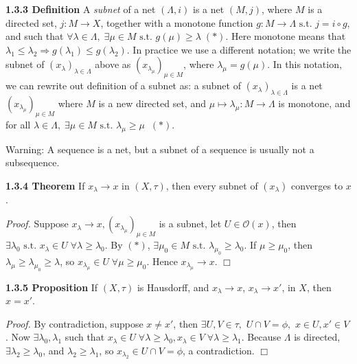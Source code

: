 \documentclass[12pt]{article}
\newcommand{\st}[0]{ \textrm{ s.t. } }
\newcommand{\rimply}[0] { \Rightarrow }
\newcommand{\rarw}[0] { \rightarrow }
\newcommand{\curlyO}[0] { \mathcal{O} }
\begin{document}
\begin{flushleft} {\bf 1.3.3 Definition} A \emph{subnet} of a net $(\Lambda, i)$ is
a net $(M, j)$, where $M$ is a directed set, $j: M \rarw X$, together with a  monotone
function $g: M \rarw \Lambda \st j = i \circ g$, and such that $\forall \lambda \in
 \Lambda, \; \exists \mu \in M \st g(\mu) \ge \lambda \; (*)$. Here monotone means that
 $\lambda_1 \le \lambda_2 \rimply g(\lambda_1) \le g(\lambda_2)$. In practice we use a
 different notation; we write the subnet of $(x_\lambda)_{\lambda \in \Lambda}$ above as
  $(x_{\lambda_\mu}) _{\mu \in M}$, where $\lambda_\mu = g(\mu)$. In this notation, we
   can rewrite out definition of a subnet as: a subnet of $(x_\lambda)_{\lambda \in
   \Lambda}$ is a net $(x_{\lambda_\mu})_{\mu \in M}$ where $M$ is a new directed set,
   and $\mu \mapsto \lambda_\mu: M \rarw \Lambda$ is monotone, and for all $\lambda \in
   \Lambda, \; \exists \mu \in M \st \lambda_\mu \ge \mu \; \; (*)$.
\end{flushleft}

Warning: A sequence is a net, but a subnet of a sequence is usually
not a subsequence.

\begin{flushleft} {\bf 1.3.4 Theorem} If $x_\lambda \rarw x$ in $(X, \tau)$, then every
 subnet of $(x_\lambda)$ converges to $x$.
\end{flushleft}

\begin{flushleft} \emph{Proof. } Suppose $x_\lambda \rarw x, (x_{\lambda_\mu})_{\mu \in M}$
 is a subnet, let $U \in \curlyO(x)$, then $\exists \lambda_0 \st x_\lambda \in U \;
  \forall \lambda \ge \lambda_0$. By $(*)$, $\exists \mu_0 \in M \st \lambda_{\mu_0}
  \ge \lambda_0$. If $\mu \ge \mu_0$, then $\lambda_\mu \ge \lambda_{\mu_0}
  \ge \lambda$, so $x_{\lambda_\mu} \in U \; \forall \mu \ge \mu_0.$
   Hence
  $x_{\lambda_\mu} \rarw x$.
$\Box$
\end{flushleft}


\begin{flushleft} {\bf 1.3.5 Proposition} If $(X, \tau)$ is Hausdorff, and $x_\lambda \rarw x$, $x_\lambda \rarw x'$, in $X$, then $x = x'$.
\end{flushleft}

\begin{flushleft} \emph{Proof. } By contradiction, suppose $x \not = x'$, then $\exists
 U, V \in \tau,$ $U \cap V = \phi,$ $x \in U, x' \in V$. Now $\exists \lambda_0,
 \lambda_1$ such that $x_\lambda \in U \; \forall \lambda \ge \lambda_0, x_\lambda \in V \; \forall \lambda \ge \lambda_1$. Because $\Lambda$ is directed, $\exists \lambda_2 \ge \lambda_0$, and $\lambda_2 \ge \lambda_1$, so $x_{\lambda_2} \in U \cap V = \phi$, a contradiction. $\Box$
\end{flushleft}
\end{document}
